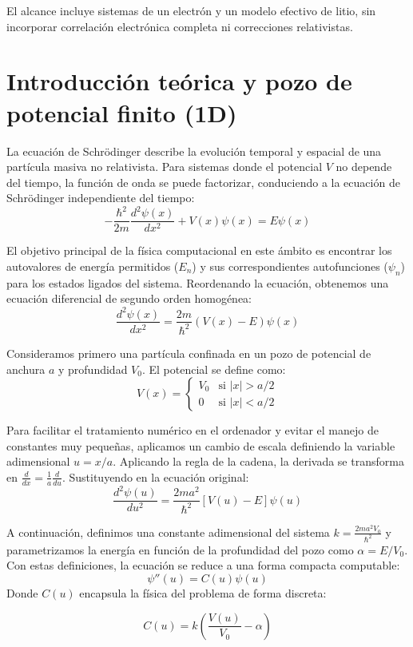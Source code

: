 \documentclass[11pt]{article}
\begin{document}
El alcance incluye sistemas de un electrón y un modelo efectivo de litio, sin incorporar correlación electrónica completa ni correcciones relativistas.

\section{Introducción teórica y pozo de potencial finito (1D)}\label{introducciuxf3n-teuxf3rica-y-pozo-de-potencial-finito-1d}

La ecuación de Schrödinger describe la evolución temporal y espacial de
una partícula masiva no relativista. Para sistemas donde el potencial
\(V\) no depende del tiempo, la función de onda se puede factorizar,
conduciendo a la ecuación de Schrödinger independiente del tiempo:
\[-\frac{\hbar^2}{2m}\frac{d^2\psi(x)}{dx^2} + V(x)\psi(x) = E\psi(x)\]

El objetivo principal de la física computacional en este ámbito es
encontrar los autovalores de energía permitidos (\(E_n\)) y sus
correspondientes autofunciones (\(\psi_n\)) para los estados ligados del
sistema. Reordenando la ecuación, obtenemos una ecuación diferencial de
segundo orden homogénea:
\[\frac{d^2\psi(x)}{dx^2} = \frac{2m}{\hbar^2}(V(x) - E)\psi(x)\]

Consideramos primero una partícula confinada en un pozo de potencial de
anchura \(a\) y profundidad \(V_0\). El potencial se define como:
\[V(x) = \begin{cases} V_0 & \text{si } |x| > a/2 \\ 0 & \text{si } |x| < a/2 \end{cases}\]

Para facilitar el tratamiento numérico en el ordenador y evitar el
manejo de constantes muy pequeñas, aplicamos un cambio de escala
definiendo la variable adimensional \(u = x/a\). Aplicando la regla de
la cadena, la derivada se transforma en
\(\frac{d}{dx} = \frac{1}{a}\frac{d}{du}\). Sustituyendo en la ecuación
original:
\[\frac{d^2\psi(u)}{du^2} = \frac{2ma^2}{\hbar^2}[V(u) - E]\psi(u)\]

A continuación, definimos una constante adimensional del sistema
\(k = \frac{2ma^2V_0}{\hbar^2}\) y parametrizamos la energía en función
de la profundidad del pozo como \(\alpha = E/V_0\). Con estas
definiciones, la ecuación se reduce a una forma compacta computable:
\[\psi''(u) = C(u)\psi(u)\] Donde \(C(u)\) encapsula la física del
problema de forma discreta:

\[
C(u) = k\left(\frac{V(u)}{V_0} - \alpha\right)
\]
\end{document}
